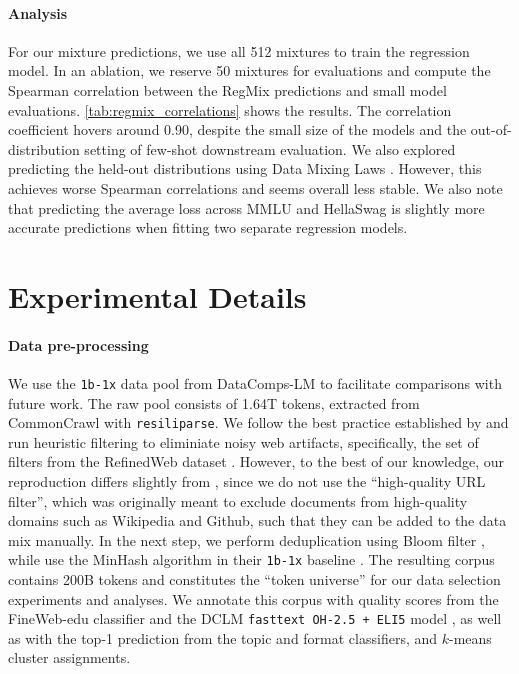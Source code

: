 \paragraph{Analysis} For our mixture predictions, we use all 512 mixtures to train the regression model. In an ablation, we reserve 50 mixtures for evaluations and compute the Spearman correlation between the RegMix predictions and small model evaluations.
\autoref{tab:regmix_correlations} shows the results.
The correlation coefficient hovers around 0.90, despite the small size of the models and the out-of-distribution setting of few-shot downstream evaluation.
We also explored predicting the held-out distributions using Data Mixing Laws \citep{ye2024datamixinglaws}. However, this achieves worse Spearman correlations and seems overall less stable.
We also note that predicting the average loss across MMLU and HellaSwag is slightly more accurate predictions when fitting two separate regression models.





\FloatBarrier

\section{Experimental Details} \label{app:data_preprocessing}

\paragraph{Data pre-processing}
We use the \texttt{1b-1x} data pool from DataComps-LM \citep{li2024datacomplm} to facilitate comparisons with future work. The raw pool consists of 1.64T tokens, extracted from CommonCrawl with \texttt{resiliparse}. We follow the best practice established by \citep{li2024datacomplm} and run heuristic filtering to eliminiate noisy web artifacts, specifically, the set of filters from the RefinedWeb dataset \citep{penedo2023refinedweb}. However, to the best of our knowledge, our reproduction differs slightly from \citet{li2024datacomplm}, since we do not use the ``high-quality URL filter'', which was originally meant to exclude documents from high-quality domains such as Wikipedia and Github, such that they can be added to the data mix manually. In the next step, we perform deduplication using Bloom filter \citep{soldaini-etal-2024-dolma}, while \citet{li2024datacomplm} use the MinHash algorithm in their \texttt{1b-1x} baseline \citep{broder1997resemblance}. The resulting corpus contains 200B tokens and constitutes the ``token universe'' for our data selection experiments and analyses. We annotate this corpus with quality scores from the FineWeb-edu classifier \citep{penedo2024finewebdatasetsdecantingweb} and the DCLM \texttt{fasttext OH-2.5 + ELI5} model \citep{joulin2017bag, li2024datacomplm}, as well as with the top-1 prediction from the topic and format classifiers, and $k$-means cluster assignments.

